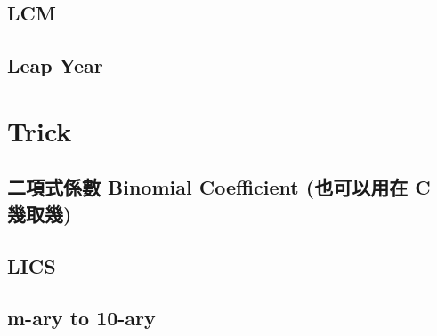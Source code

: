     \subsection{LCM}
        
    \subsection{Leap Year}
        


\section{Trick}
    \subsection{二項式係數 Binomial Coefficient (也可以用在 C 幾取幾)}
        
    \subsection{LICS}
        
    \subsection{m-ary to 10-ary}
        